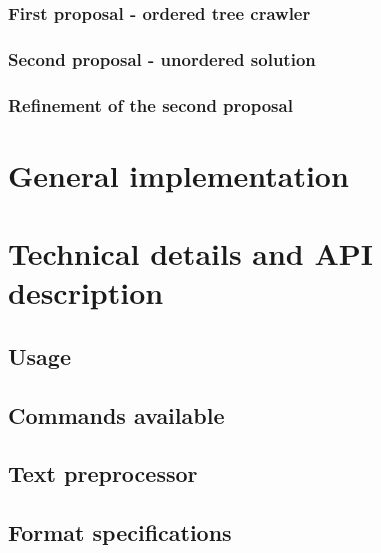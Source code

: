         \subsection{First proposal - ordered tree crawler} 

        \subsection{Second proposal - unordered solution} 

        \subsection{Refinement of the second proposal} 

\chapter{General implementation}

    \label{ch:implementation}

   

    

    

\chapter{Technical details and API description}
    \label{ch:faq}

    \section{Usage} 

    \section{Commands available} 

    \section{Text preprocessor} 

    \section{Format specifications}

